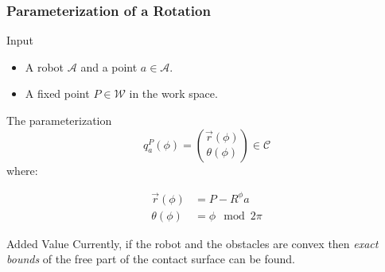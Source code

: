\documentclass[ucs,9pt,pagenumbersfull]{beamer}
\begin{document}
\begin{frame}
  \frametitle{Parameterization of a Rotation}
  \begin{block}{Input}
    \begin{itemize}
    \item A robot \(\mathcal{A}\) and a point \(a\in\mathcal{A}\).
    \item A fixed point \(P \in \mathcal{W}\) in the work space.
    \end{itemize}
  \end{block}

  \begin{minipage}{0.45\linewidth}
    \begin{block}{The parameterization}
      \[
      q^P_a(\phi) = \binom{\vec{r}(\phi)}{\theta(\phi)} \in
      \mathcal{C}
      \]
      where:

    \begin{align*}
      \vec{r}(\phi) & =  P- R^{\phi} a\\
      \theta(\phi) & = \phi \mod 2\pi
    \end{align*}
  \end{block}
\end{minipage}
\hfill
\begin{minipage}{0.45\linewidth}
  \begin{block}{Added Value}
    Currently, if the robot and the obstacles are convex then \emph{exact
    bounds} of the free part of the contact surface can be found.
  \end{block}
\end{minipage}
\end{frame}
\end{document}
